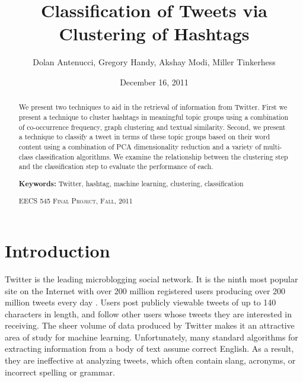 
\begin{abstract}
We present two techniques to aid in the retrieval of information from Twitter. First we present a technique to cluster hashtags in meaningful topic groups using a combination of co-occurrence frequency, graph clustering and textual similarity. Second, we present a technique to classify a tweet in terms of these topic groups based on their word content using a combination of PCA dimensionality reduction and a variety of multi-class classification algorithms. We examine the relationship between the clustering step and the classification step to evaluate the performance of each.

\vspace{0.1in}
\begin{flushleft}
\textbf{Keywords:} Twitter, hashtag, machine learning, clustering, classification
\end{flushleft}

\vspace{0.2in}
\begin{center}
\fontsize{13}{1}\textsc{EECS 545 Final Project, Fall, 2011}\selectfont
\end{center}
\end{abstract}


\title{Classification of Tweets via Clustering of Hashtags}
\author{Dolan Antenucci, Gregory Handy, Akshay Modi, Miller Tinkerhess} 
\date{December 16, 2011}

\maketitle


\section{Introduction}
Twitter is the leading microblogging social network. It is the ninth most popular site on the Internet with over 200 million registered users producing over 200 million tweets every day \cite{Shiels2011,Alexa2011,Twitter.com2011}. Users post publicly viewable tweets of up to 140 characters in length, and follow other users whose tweets they are interested in receiving. The sheer volume of data produced by Twitter makes it an attractive area of study for machine learning. Unfortunately, many standard algorithms for extracting information from a body of text assume correct English. As a result, they are ineffective at analyzing tweets, which often contain slang, acronyms, or incorrect spelling or grammar.

